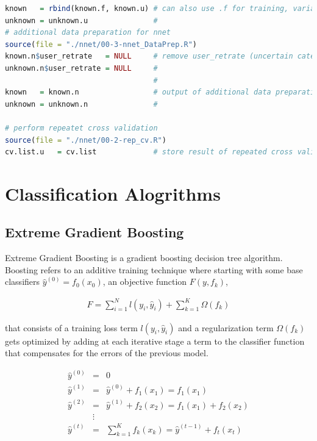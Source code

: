 \documentclass[a4paper,12pt]{article}
\begin{document}
\begin{lstlisting}[language=r]
known   = rbind(known.f, known.u) # can also use .f for training, variables are pure
unknown = unknown.u               #
# additional data preparation for nnet
source(file = "./nnet/00-3-nnet_DataPrep.R")
known.n$user_retrate   = NULL     # remove user_retrate (uncertain categories)
unknown.n$user_retrate = NULL     #
                                  #
known   = known.n                 # output of additional data preparation
unknown = unknown.n               #

# perform repeatet cross validation
source(file = "./nnet/00-2-rep_cv.R")
cv.list.u   = cv.list             # store result of repeated cross validation

\end{lstlisting}



\section{Classification Alogrithms}

\subsection{Extreme Gradient Boosting}
Extreme Gradient Boosting is a gradient boosting decision tree algorithm. Boosting refers to an additive training technique where starting with some base classifiers $\hat{y}^{(0)}= f_0(x_0)$, an objective function $F(y,f_k)$,

\begin{eqnarray*}
F = \displaystyle\sum_{i=1}^{N} l(y_i, \hat{y}_i) + \displaystyle\sum_{k=1}^{K} \Omega(f_k) 
\end{eqnarray*}

that consists of a training loss term $l(y_i,\hat{y}_i)$ and a regularization term $\Omega(f_k)$ gets optimized by adding at each iterative stage a term to the classifier function that compensates for the errors of the previous model. 

\begin{eqnarray*}
\hat{y}^{(0)} &=& 0       \\
\hat{y}^{(1)} &=& \hat{y}^{(0)} + f_1(x_1) =  f_1(x_1)   \\
\hat{y}^{(2)} &=& \hat{y}^{(1)}+f_2(x_2) = f_1(x_1) + f_2(x_2) \\
&\vdots& \\
\hat{y}^{(t)} &=& \displaystyle\sum_{k=1}^{K} f_k(x_k) = \hat{y}^{(t-1)} + f_t(x_t)
\end{eqnarray*}
\end{document}
